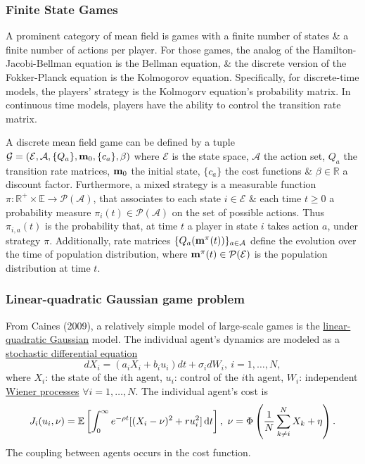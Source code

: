 \documentclass{article}
\begin{document}
\subsubsection{Finite State Games}
A prominent category of mean field is games with a finite number of states \& a finite number of actions per player. For those games, the analog of the Hamilton-Jacobi-Bellman equation is the Bellman equation, \& the discrete version of the Fokker-Planck equation is the Kolmogorov equation. Specifically, for discrete-time models, the players' strategy is the Kolmogorv equation's probability matrix. In continuous time models, players have the ability to control the transition rate matrix.

A discrete mean field game can be defined by a tuple $\mathcal{G} = (\mathcal{E},\mathcal{A},\{Q_a\},{\bf m}_0,\{c_a\},\beta)$ where $\mathcal{E}$ is the state space, $\mathcal{A}$ the action set, $Q_a$ the transition rate matrices, ${\bf m}_0$ the initial state, $\{c_a\}$ the cost functions \& $\beta\in\mathbb{R}$ a discount factor. Furthermore, a mixed strategy is a measurable function $\pi:\mathbb{R}^+\times\mathbb{E}\to\mathcal{P}(\mathcal{A})$, that associates to each state $i\in\mathcal{E}$ \& each time $t\ge0$ a probability measure $\pi_i(t)\in\mathcal{P}(\mathcal{A})$ on the set of possible actions. Thus $\pi_{i,a}(t)$ is the probability that, at time $t$ a player in state $i$ takes action $a$, under strategy $\pi$. Additionally, rate matrices $\{Q_a({\bf m}^\pi(t))\}_{a\in\mathcal{A}}$ define the evolution over the time of population distribution, where ${\bf m}^\pi(t)\in\mathcal{P}(\mathcal{E})$ is the population distribution at time $t$.

\subsubsection{Linear-quadratic Gaussian game problem}
From Caines (2009), a relatively simple model of large-scale games is the \href{https://en.wikipedia.org/wiki/Linear%E2%80%93quadratic%E2%80%93Gaussian_control}{linear-quadratic Gaussian} model. The individual agent's dynamics are modeled as a \href{https://en.wikipedia.org/wiki/Stochastic_differential_equation}{stochastic differential equation}
\begin{equation*}
	dX_i = (a_iX_i + b_iu_i)dt + \sigma_idW_i,\ i = 1,\ldots,N,
\end{equation*}
where $X_i$: the state of the $i$th agent, $u_i$: control of the $i$th agent, $W_i$: independent \href{https://en.wikipedia.org/wiki/Wiener_process}{Wiener processes} $\forall i = 1,\ldots,N$. The individual agent's cost is
\begin{equation*}
	J_i(u_i,\nu) = \mathbb{E}\left[\int_0^\infty e^{-\rho t}[(X_i - \nu)^2 + ru_i^2]\,{\rm d}t\right],\ \nu = \Phi\left(\frac{1}{N}\sum_{k\ne i}^N X_k + \eta\right).
\end{equation*}
The coupling between agents occurs in the cost function.
\end{document}
